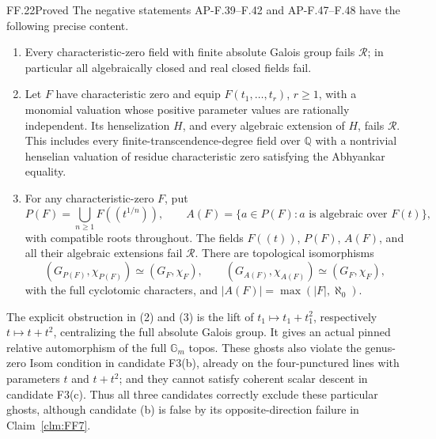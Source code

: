 \begin{claim}{FF.22}{Proved}\label{clm:FFghosts}
The negative statements AP-F.39--F.42 and AP-F.47--F.48
have the following precise content.
\begin{enumerate}
\item Every characteristic-zero field with finite absolute
Galois group fails \(\mathcal R\); in particular all
algebraically closed and real closed fields fail.
\item Let \(F\) have characteristic zero and equip
\(F(t_1,\ldots,t_r)\), \(r\ge1\), with a monomial
valuation whose positive parameter values are rationally
independent. Its henselization \(H\), and every algebraic
extension of \(H\), fails \(\mathcal R\). This includes
every finite-transcendence-degree field over \(\mathbb Q\)
with a nontrivial henselian valuation of residue
characteristic zero satisfying the Abhyankar equality.
\item For any characteristic-zero \(F\), put
\[
 P(F)=\bigcup_{n\ge1}F((t^{1/n})),\qquad
 A(F)=\{a\in P(F):a\text{ is algebraic over }F(t)\},
\]
with compatible roots throughout. The fields \(F((t))\),
\(P(F)\), \(A(F)\), and all their algebraic extensions
fail \(\mathcal R\). There are topological isomorphisms
\[
 (G_{P(F)},\chi_{P(F)})\simeq(G_F,\chi_F),\qquad
 (G_{A(F)},\chi_{A(F)})\simeq(G_F,\chi_F),
\]
with the full cyclotomic characters, and
\(\lvert A(F)\rvert=\max(\lvert F\rvert,\aleph_0)\).
\end{enumerate}
The explicit obstruction in (2) and (3) is the lift of
\(t_1\mapsto t_1+t_1^2\), respectively
\(t\mapsto t+t^2\), centralizing the full absolute Galois
group. It gives an actual pinned relative automorphism of
the full \(\mathbb G_m\) topos. These ghosts also violate
the genus-zero Isom condition in candidate F3(b), already
on the four-punctured lines with parameters \(t\) and
\(t+t^2\); and they cannot satisfy coherent scalar descent
in candidate F3(c). Thus all three candidates correctly
exclude these particular ghosts, although candidate (b)
is false by its opposite-direction failure in
Claim~\ref{clm:FF7}.
\end{claim}
